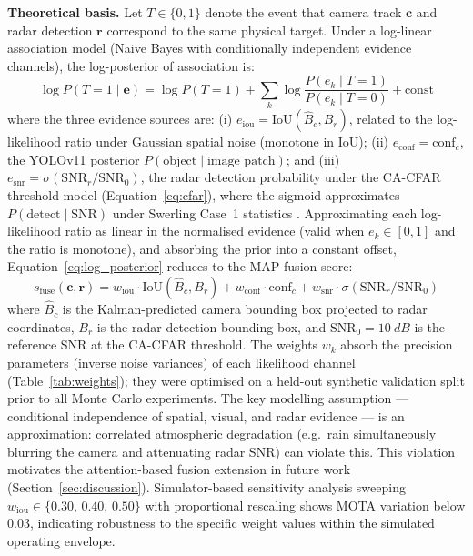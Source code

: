 \documentclass[drones,article,submit,pdftex]{Definitions/mdpi}
\begin{document}
\textbf{Theoretical basis.}
Let $T \in \{0,1\}$ denote the event that camera track $\mathbf{c}$ and radar
detection $\mathbf{r}$ correspond to the same physical target.
Under a log-linear association model (Naive Bayes with conditionally independent
evidence channels), the log-posterior of association is:
\begin{equation}
  \log P(T{=}1 \mid \mathbf{e}) = \log P(T{=}1)
    + \sum_{k} \log \frac{P(e_k \mid T{=}1)}{P(e_k \mid T{=}0)} + \text{const}
  \label{eq:log_posterior}
\end{equation}
where the three evidence sources are:
(i) $e_\text{iou} = \text{IoU}(\hat{B}_c, B_r)$, related to the log-likelihood
ratio under Gaussian spatial noise (monotone in IoU);
(ii) $e_\text{conf} = \text{conf}_c$, the YOLOv11 posterior
$P(\text{object} \mid \text{image patch})$; and
(iii) $e_\text{snr} = \sigma(\text{SNR}_r/\text{SNR}_0)$, the radar detection
probability under the CA-CFAR threshold model
(Equation~\eqref{eq:cfar}), where the sigmoid approximates
$P(\text{detect} \mid \text{SNR})$ under Swerling Case~1 statistics
\cite{ref_skolnik}.
Approximating each log-likelihood ratio as linear in the normalised evidence
(valid when $e_k \in [0,1]$ and the ratio is monotone), and absorbing the
prior into a constant offset, Equation~\eqref{eq:log_posterior} reduces to the
MAP fusion score:
\begin{equation}
  s_\text{fuse}(\mathbf{c}, \mathbf{r}) =
    w_\text{iou} \cdot \text{IoU}(\hat{B}_c, B_r)
    + w_\text{conf} \cdot \text{conf}_c
    + w_\text{snr}  \cdot \sigma(\text{SNR}_r / \text{SNR}_{0})
  \label{eq:fusion_score}
\end{equation}
where $\hat{B}_c$ is the Kalman-predicted camera bounding box projected to
radar coordinates, $B_r$ is the radar detection bounding box, and
$\text{SNR}_0 = \SI{10}{dB}$ is the reference SNR at the CA-CFAR threshold.
The weights $w_k$ absorb the precision parameters (inverse noise variances)
of each likelihood channel (Table~\ref{tab:weights});
they were optimised on a held-out synthetic validation split prior to all
Monte Carlo experiments.
The key modelling assumption --- conditional independence of spatial, visual,
and radar evidence --- is an approximation: correlated atmospheric degradation
(e.g.\ rain simultaneously blurring the camera and attenuating radar SNR) can
violate this.
This violation motivates the attention-based fusion extension in future work
(Section~\ref{sec:discussion}).
Simulator-based sensitivity analysis sweeping
$w_\text{iou} \in \{0.30,\, 0.40,\, 0.50\}$ with proportional rescaling
shows MOTA variation below 0.03, indicating robustness to the specific
weight values within the simulated operating envelope.
\end{document}
